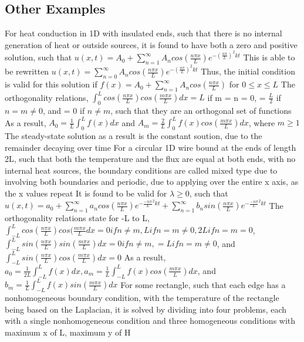 \documentclass[11 pt, twoside]{article}
\newenvironment{outline*}
{
	\begin{outline}[enumerate]
	}
	{\end{outline}
}
\begin{document}
\subsection{Other Examples}
\begin{outline*}
\1 For heat conduction in 1D with insulated ends, such that there is no internal generation of heat or outside sources, it is found to have both a zero and positive solution, such that $u(x, t) = A_0 + \sum^{\infty}_{n = 1} A_n cos(\frac{n \pi x}{L})e^{-(\frac{n\pi}{L})^2kt}$
	\2 This is able to be rewritten $u(x, t) = \sum^{\infty}_{n = 0} A_n cos(\frac{n \pi x}{L})e^{-(\frac{n\pi}{L})^2kt}$
	\2 Thus, the initial condition is valid for this solution if $f(x) = A_0 + \sum^{\infty}_{n = 1} A_n cos(\frac{n\pi x}{L})$ for $0 \leq x \leq L$
	\2 The orthogonality relations, $\int^L_0 cos(\frac{n\pi x}{L})cos(\frac{m\pi x}{L})dx = L$ if m = n = 0, = $\frac{L}{2}$ if $n = m \neq 0$, and = 0 if $n \neq m$, such that they are an orthogonal set of functions
		\3 As a result, $A_0 = \frac{1}{L} \int^L_0 f(x)dx$ and $A_m = \frac{2}{L} \int^L_0 f(x) cos(\frac{m\pi x}{L})dx$, where $m \geq 1$
	\2 The steady-state solution as a result is the constant soution, due to the remainder decaying over time
\1 For a circular 1D wire bound at the ends of length 2L, such that both the temperature and the flux are equal at both ends, with no internal heat sources, the boundary conditions are called mixed type due to involving both boundaries and periodic, due to applying over the entire x axis, as the x values repeat
	\2 It is found to be valid for $\lambda \geq 0$, such that $u(x, t) = a_0 + \sum_{n = 1}^{\infty} a_n cos(\frac{n\pi x}{L})e^{-\frac{-n\pi}{L}^2kt} + \sum_{n = 1}^{\infty} b_n sin(\frac{n\pi x}{L})e^{-\frac{-n\pi}{L}^2kt}$
	\2 The orthogonality relations state for -L to L, $\int^L_{-L} cos(\frac{n\pi x}{L})cos(\frac{m\pi x}{L}dx = 0 if n \neq m, L if n = m \neq 0, 2L if n = m = 0$, $\int^L_{-L} sin(\frac{n\pi x}{L})sin(\frac{m\pi x}{L})dx = 0 if n \neq m, = L if n = m \neq 0$, and $\int^L_{-L} sin(\frac{n\pi x}{L})cos(\frac{m\pi x}{L})dx = 0$
		\3 As a result, $a_0 = \frac{1}{2L} \int^L_{-L} f(x)dx, a_m = \frac{1}{L} \int^L_{-L} f(x) cos(\frac{m\pi x}{L})dx$, and $b_m = \frac{1}{L} \int^L_{-L} f(x) sin(\frac{m\pi x}{L})dx$
\1 For some rectangle, such that each edge has a nonhomogeneous boundary condition, with the temperature of the rectangle being based on the Laplacian, it is solved by dividing into four problems, each with a single nonhomogeneous condition and three homogeneous conditions with maximum x of L, maximum y of H

\end{outline*}
\end{document}
